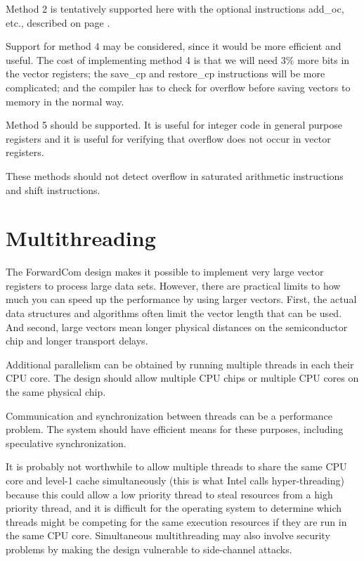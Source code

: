 \documentclass[forwardcom.tex]{subfiles}
\begin{document}
Method 2 is tentatively supported here with the optional instructions add\_oc, etc., described on page \pageref{table:addOcInstruction}. 
\vspace{2mm}

Support for method 4 may be considered, since it would be more efficient and useful. The cost of implementing method 4 is that we will need 3\% more bits in the vector registers; the save\_cp and restore\_cp instructions will be more complicated; and the compiler has to check for overflow before saving vectors to memory in the normal way. 
\vspace{2mm}

Method 5 should be supported. It is useful for integer code in general purpose registers and it is useful for verifying that overflow does not occur in vector registers.
\vspace{2mm}

These methods should not detect overflow in saturated arithmetic instructions and shift instructions.

\section{Multithreading}
The ForwardCom design makes it possible to implement very large vector registers to process large data sets. However, there are practical limits to how much you can speed up the performance by using larger vectors. First, the actual data structures and algorithms often limit the vector length that can be used. And second, large vectors mean longer physical distances on the semiconductor chip and longer transport delays.
\vspace{2mm}

Additional parallelism can be obtained by running multiple threads in each their CPU core. The design should allow multiple CPU chips or multiple CPU cores on the same physical chip.
\vspace{2mm}

Communication and synchronization between threads can be a performance problem. The system should have efficient means for these purposes, including speculative synchronization.
\vspace{2mm}

It is probably not worthwhile to allow multiple threads to share the same CPU core and level-1 cache simultaneously (this is what Intel calls hyper-threading) because this could allow a low priority thread to steal resources from a high priority thread, and it is difficult for the operating system to determine which threads might be competing for the same execution resources if they are run in the same CPU core. Simultaneous multithreading may also involve security problems by making the design vulnerable to side-channel attacks.
\vspace{2mm}
\end{document}
